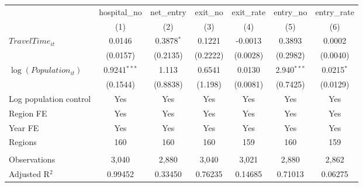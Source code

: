 \begingroup
\centering
\begin{tabular}{lcccccc}
   \toprule
                            & hospital\_no   & net\_entry   & exit\_no  & exit\_rate  & entry\_no     & entry\_rate \\    
                            & (1)            & (2)          & (3)       & (4)         & (5)           & (6)\\  
   \midrule 
   $TravelTime_{it}$        & 0.0146         & 0.3878$^{*}$ & 0.1221    & -0.0013     & 0.3893        & 0.0002\\   
                            & (0.0157)       & (0.2135)     & (0.2222)  & (0.0028)    & (0.2982)      & (0.0040)\\   
   $\log(Population_{it})$  & 0.9241$^{***}$ & 1.113        & 0.6541    & 0.0130      & 2.940$^{***}$ & 0.0215$^{*}$\\   
                            & (0.1544)       & (0.8838)     & (1.198)   & (0.0081)    & (0.7425)      & (0.0129)\\   
   Log population control   & Yes            & Yes          & Yes       & Yes         & Yes           & Yes\\  
   Region FE                & Yes            & Yes          & Yes       & Yes         & Yes           & Yes\\  
   Year FE                  & Yes            & Yes          & Yes       & Yes         & Yes           & Yes\\  
   Regions                  & 160            & 160          & 160       & 159         & 160           & 159\\  
    \\
   Observations             & 3,040          & 2,880        & 3,040     & 3,021       & 2,880         & 2,862\\  
   Adjusted R$^2$           & 0.99452        & 0.33450      & 0.76235   & 0.14685     & 0.71013       & 0.06275\\  
   \bottomrule
\end{tabular}
\par\endgroup

